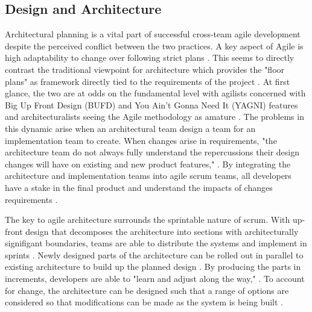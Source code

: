 \subsection{Design and Architecture}
Architectural planning is a vital part of successful cross-team agile development despite the perceived conflict between the two practices.
A key aspect of Agile is high adaptability to change over following strict plans \cite{AgileMani}.
This seems to directly contrast the traditional viewpoint for architecture which provides the "floor plans" as framework directly tied to the requirements of the project \cite{perry1992foundations}.
At first glance, the two are at odds on the fundamental level with agilists concerned with Big Up Front Design (BUFD) and You Ain't Gonna Need It (YAGNI) features and architecturalists seeing the Agile methodology as amature \cite{kruchten2010software}.
The problems in this dynamic arise when an architectural team design a team for an implementation team to create.
When changes arise in requirements, "the architecture team do not always fully understand the repercussions their design changes will have on existing and new product features," \cite{isham2008agile}.
By integrating the architecture and implementation teams into agile scrum teams, all developers have a stake in the final product and understand the impacts of changes requirements \cite{isham2008agile}.


The key to agile architecture surrounds the sprintable nature of scrum.
With up-front design that decomposes the architecture into sections with architecturally signifigant boundaries, teams are able to distribute the systems and implement in sprints \cite{madison2010agile}.
Newly designed parts of the architecture can be rolled out in parallel to existing architecture to build up the planned design \cite{isham2008agile}.
By producing the parts in increments, developers are able to "learn and adjust along the way," \cite{isham2008agile}.
To account for change, the architecture can be designed such that a range of options are considered so that modifications can be made as the system is being built \cite{madison2010agile}.
